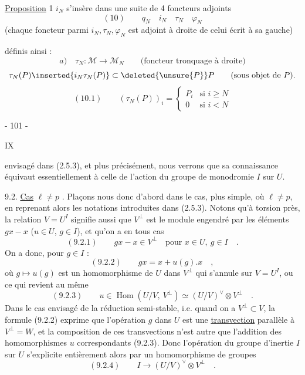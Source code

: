 \uline{Proposition} 1 $i_N$ s'insère dans une suite de 4 foncteurs adjoints
\[
(10)\qquad q_N\quad i_N\quad\tau_N\quad\varphi_N
\]
(chaque foncteur  parmi $i_N,\tau_N,\varphi_N$ est adjoint à droite de celui écrit à sa gauche)

définis ainsi :
\[
a)\quad\tau_N:\mathcal M\longrightarrow\mathcal M_N\qquad
\text{(foncteur tronquage à droite)}
\]
\[
\tau_N(P)\inserted{i_N\tau_N(P)}\subset\deleted{\unsure{P}}P\qquad\text{(sous objet de }P\text{)}.
\]
\[
(10.1)\qquad(\tau_N(P))_i=\left\{\begin{array}{ll}P_i&\text{si }i\geq N\\0&\text{si }i<N\end{array}\right.
\]

\begin{center}- 101 -\end{center}\hfill IX

envisagé dans (2.5.3), et plus précisément, nous verrons que sa connaissance équivaut essentiellement à celle de l'action du groupe de monodromie $I$ sur $U$.

9.2. \uline{Cas} $\ell\ne p$ . Plaçons nous donc d'abord dans le cas, plus simple, où $\ell\ne p$, en reprenant alors les notations introduites dans (2.5.3). Notons qu'à torsion près, la relation $V=U^I$ signifie aussi que $V^\perp$ est le module engendré par les éléments $gx-x$ ($u\in U$, $g\in I$), et qu'on a en tous cas
\[
(9.2.1)\qquad gx-x\in V^\perp\quad\text{pour }x\in U,\ g\in I\quad.
\]
On a donc, pour $g\in I$ :
\[
(9.2.2)\qquad gx=x+u(g).x\quad,
\]
où $g\longmapsto u(g)$ est un homomorphisme de $U$ dans $V^\perp$ qui s'annule sur $V=U^I$, ou ce qui revient au même
\[
(9.2.3)\qquad u\in\operatorname{Hom}(U/V,\ V^\perp)\simeq(U/V)^\vee\otimes V^\perp\quad.
\]
Dans le cas envisagé de la réduction semi-stable, i.e. quand on a $V^\perp\subset V$, la formule (9.2.2) exprime que l'opération $g$ dans $U$ est une \uline{transvection} parallèle à $V^\perp=W$, et la composition de ces transvections n'est autre que l'addition des homomorphismes $u$ correspondants (9.2.3). Donc l'opération du groupe d'inertie $I$ sur $U$ s'explicite entièrement alors par un homomorphisme de groupes
\[
(9.2.4)\qquad I\longrightarrow(U/V)^\vee\otimes V^\perp\quad.
\]
\margin{$\longleftarrow$}

